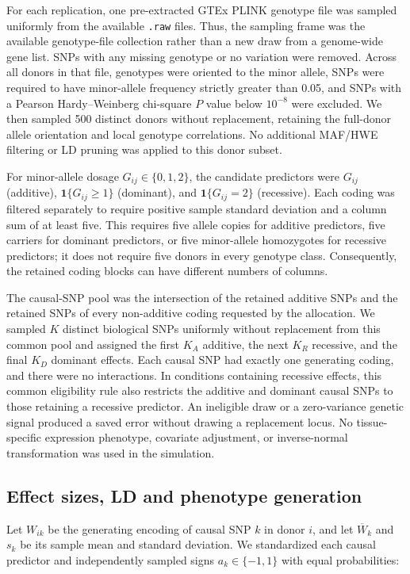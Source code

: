 \documentclass[12pt]{article}
\begin{document}
For each replication, one pre-extracted GTEx PLINK genotype file was
sampled uniformly from the available \texttt{.raw} files. Thus, the
sampling frame was the available genotype-file collection rather than
a new draw from a genome-wide gene list. SNPs with any missing
genotype or no variation were removed. Across all donors in that file,
genotypes were oriented to the minor allele, SNPs were required to
have minor-allele frequency strictly greater than 0.05, and SNPs with
a Pearson Hardy--Weinberg chi-square $P$ value below $10^{-8}$ were
excluded. We then sampled 500 distinct donors without replacement,
retaining the full-donor allele orientation and local genotype
correlations. No additional MAF/HWE filtering or LD pruning was applied
to this donor subset.

For minor-allele dosage $G_{ij}\in\{0,1,2\}$, the candidate predictors
were $G_{ij}$ (additive), $\mathbf{1}\{G_{ij}\geq1\}$ (dominant), and
$\mathbf{1}\{G_{ij}=2\}$ (recessive). Each coding was filtered separately
to require positive sample standard deviation and a column sum of at
least five. This requires five allele copies for additive predictors,
five carriers for dominant predictors, or five minor-allele homozygotes
for recessive predictors; it does not require five donors in every
genotype class. Consequently, the retained coding blocks can have
different numbers of columns.

The causal-SNP pool was the intersection of the retained additive SNPs
and the retained SNPs of every non-additive coding requested by the
allocation. We sampled $K$ distinct biological SNPs uniformly without
replacement from this common pool and assigned the first $K_A$ additive,
the next $K_R$ recessive, and the final $K_D$ dominant effects. Each
causal SNP had exactly one generating coding, and there were no
interactions. In conditions containing recessive effects, this common
eligibility rule also restricts the additive and dominant causal SNPs
to those retaining a recessive predictor. An ineligible draw or a
zero-variance genetic signal produced a saved error without drawing a
replacement locus. No tissue-specific expression phenotype, covariate
adjustment, or inverse-normal transformation was used in the simulation.

\subsection{Effect sizes, LD and phenotype generation}

Let $W_{ik}$ be the generating encoding of causal SNP $k$ in donor $i$,
and let $\overline{W}_k$ and $s_k$ be its sample mean and standard
deviation. We standardized each causal predictor and independently
sampled signs $a_k\in\{-1,1\}$ with equal probabilities:
\end{document}
